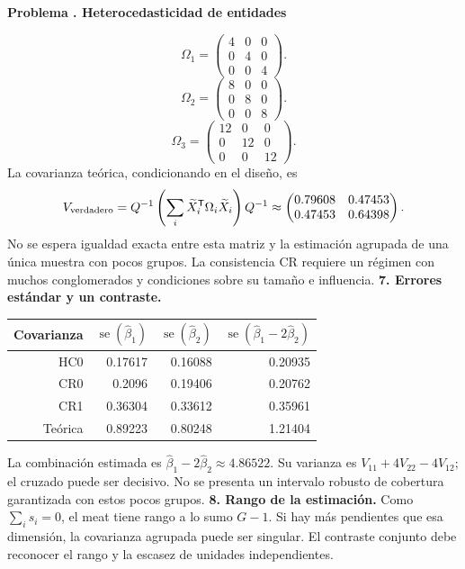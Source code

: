 \documentclass[11pt,a4paper]{article}
\newcommand{\T}{^{\mathsf T}}
\theoremstyle{definition}
\newcounter{problema}
\newenvironment{resuelto}[1]{\refstepcounter{problema}\par\medskip\Needspace{6\baselineskip}\textbf{Problema \theproblema. #1}\par}{\par\medskip}
\DeclareMathOperator{\se}{se}
\begin{document}
\begin{resuelto}{Heterocedasticidad de entidades}
\[
\Omega_{1}=\begin{pmatrix}
4&0&0\\0&4&0\\0&0&4
\end{pmatrix}.
\]
\[
\Omega_{2}=\begin{pmatrix}
8&0&0\\0&8&0\\0&0&8
\end{pmatrix}.
\]
\[
\Omega_{3}=\begin{pmatrix}
12&0&0\\0&12&0\\0&0&12
\end{pmatrix}.
\]
La covarianza teórica, condicionando en el diseño, es
\[
V_{\rm verdadero}=Q^{-1}\left(\sum_i\widetilde X_i\T\Omega_i\widetilde X_i\right)Q^{-1}\approx\begin{pmatrix}
0.79608&0.47453\\0.47453&0.64398
\end{pmatrix}.
\]
No se espera igualdad exacta entre esta matriz y la estimación agrupada de una única muestra con pocos grupos. La consistencia CR requiere un régimen con muchos conglomerados y condiciones sobre su tamaño e influencia.
\textbf{7. Errores estándar y un contraste.}

\begin{center}\small
\begin{tabular}{rrrr}
\toprule
Covarianza&$\se(\widehat\beta_1)$&$\se(\widehat\beta_2)$&$\se(\widehat\beta_1-2\widehat\beta_2)$\\
\midrule
HC0&0.17617&0.16088&0.20935\\
CR0&0.2096&0.19406&0.20762\\
CR1&0.36304&0.33612&0.35961\\
Teórica&0.89223&0.80248&1.21404\\
\bottomrule
\end{tabular}
\end{center}
La combinación estimada es $\widehat\beta_1-2\widehat\beta_2\approx4.86522$. Su varianza es $V_{11}+4V_{22}-4V_{12}$; el cruzado puede ser decisivo. No se presenta un intervalo robusto de cobertura garantizada con estos pocos grupos.
\textbf{8. Rango de la estimación.} Como $\sum_i s_i=0$, el meat tiene rango a lo sumo $G-1$. Si hay más pendientes que esa dimensión, la covarianza agrupada puede ser singular. El contraste conjunto debe reconocer el rango y la escasez de unidades independientes.
\end{resuelto}
\end{document}
